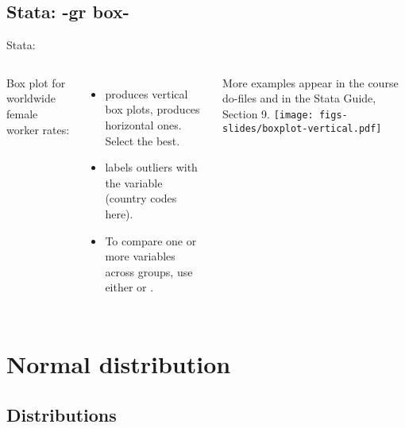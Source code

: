 \documentclass{beamer}
\begin{document}
	\subsection{Stata: -gr box-}
	
	\begin{frame}[t]{Stata: }
				
	\begin{columns}[T]

		Box plot for worldwide female worker rates:\\

	\\[1em]

			\begin{itemize}
			\item {} produces vertical box plots,  produces horizontal ones. Select the best.
			\item {} labels outliers with the variable  (country codes here).
			\item To compare one or more variables across groups, use either  or .
		\end{itemize}
		More examples appear in the course do-files and in the Stata Guide, Section 9.
		\texttt{[image: figs-slides/boxplot-vertical.pdf]}		
	\end{columns}
		
	\end{frame}
	
	
	\section{Normal distribution}

	\subsection{Distributions}
	
\end{document}
